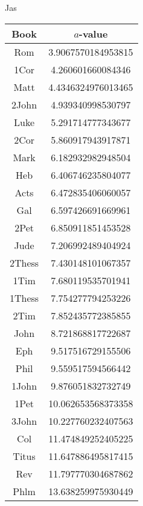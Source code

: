 \documentclass[12pt,letterpaper]{article}
\begin{document}
Jas
\begin{longtable}{|c|c|}
\hline
 Book & $a$-value \\ \hline
Rom & 3.9067570184953815 \\ \hline
 1Cor & 4.260601660084346 \\ \hline
 Matt & 4.4346324976013465 \\ \hline
 2John & 4.939340998530797 \\ \hline
 Luke & 5.291714777343677 \\ \hline
 2Cor & 5.860917943917871 \\ \hline
 Mark & 6.182932982948504 \\ \hline
 Heb & 6.406746235804077 \\ \hline
 Acts & 6.472835406060057 \\ \hline
 Gal & 6.597426691669961 \\ \hline
 2Pet & 6.850911851453528 \\ \hline
 Jude & 7.206992489404924 \\ \hline
 2Thess & 7.430148101067357 \\ \hline
 1Tim & 7.680119535701941 \\ \hline
 1Thess & 7.754277794253226 \\ \hline
 2Tim & 7.852435772385855 \\ \hline
 John & 8.721868817722687 \\ \hline
 Eph & 9.517516729155506 \\ \hline
 Phil & 9.559517594566442 \\ \hline
 1John & 9.876051832732749 \\ \hline
 1Pet & 10.062653568373358 \\ \hline
 3John & 10.227760232407563 \\ \hline
 Col & 11.474849252405225 \\ \hline
 Titus & 11.647886495817415 \\ \hline
 Rev & 11.797770304687862 \\ \hline
 Phlm & 13.638259975930449 \\ \hline 
\end{longtable}
\end{document}

